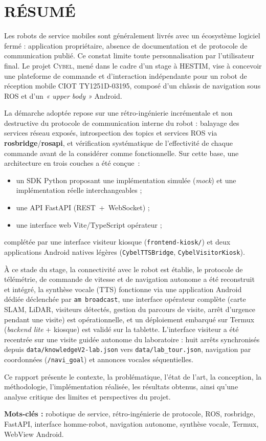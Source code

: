 \section*{\centering RÉSUMÉ}

Les robots de service mobiles sont généralement livrés avec un écosystème logiciel fermé :
application propriétaire, absence de documentation et de protocole de communication publié.
Ce constat limite toute personnalisation par l'utilisateur final. Le projet \textsc{Cybel}, mené
dans le cadre d'un stage à HESTIM, vise à concevoir une plateforme de commande et
d'interaction indépendante pour un robot de réception mobile CIOT TY1251D-03195, composé d'un
châssis de navigation sous ROS et d'un \emph{« upper body »} Android.

La démarche adoptée repose sur une rétro-ingénierie incrémentale et non destructive du protocole
de communication interne du robot : balayage des services réseau exposés, introspection des
topics et services ROS via \textbf{rosbridge}/\textbf{rosapi}, et vérification systématique de
l'effectivité de chaque commande avant de la considérer comme fonctionnelle. Sur cette base, une
architecture en trois couches a été conçue~:
\begin{itemize}
    \item un SDK Python proposant une implémentation simulée (\emph{mock}) et une implémentation
    réelle interchangeables ;
    \item une API FastAPI (REST~+~WebSocket) ;
    \item une interface web Vite/TypeScript opérateur ;
\end{itemize}
complétée par une interface visiteur kiosque (\texttt{frontend-kiosk/}) et deux applications
Android natives légères (\texttt{CybelTTSBridge}, \texttt{CybelVisitorKiosk}).

À ce stade du stage, la connectivité avec le robot est établie, le protocole de télémétrie, de
commande de vitesse et de navigation autonome a été reconstruit et intégré, la synthèse vocale
(TTS) fonctionne via une application Android dédiée déclenchée par \texttt{am broadcast}, une
interface opérateur complète (carte SLAM, LiDAR, visiteurs détectés, gestion du parcours de
visite, arrêt d'urgence pendant une visite) est opérationnelle, et un déploiement embarqué sur
Termux (\emph{backend lite} + kiosque) est validé sur la tablette. L'interface visiteur a été
recentrée sur une visite guidée autonome du laboratoire : huit arrêts synchronisés depuis
\texttt{data/knowledgeV2-lab.json} vers \texttt{data/lab\_tour.json}, navigation par coordonnées
(\texttt{/navi\_goal}) et annonces vocales séquentielles.

Ce rapport présente le contexte, la problématique, l'état de l'art, la conception, la
méthodologie, l'implémentation réalisée, les résultats obtenus, ainsi qu'une analyse critique des
limites et perspectives du projet.

\bigskip
\noindent\textbf{Mots-clés :} robotique de service, rétro-ingénierie de protocole, ROS,
rosbridge, FastAPI, interface homme-robot, navigation autonome, synthèse vocale, Termux, WebView
Android.